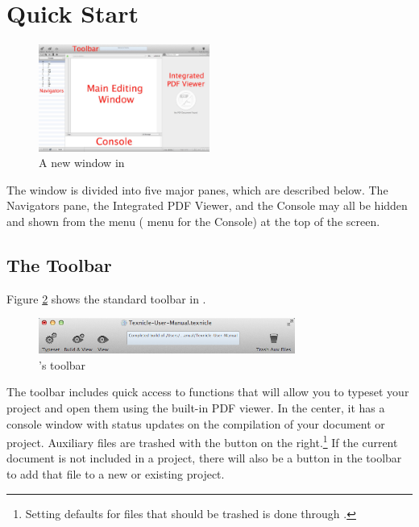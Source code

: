 \section{Quick Start}
\label{userguide.quickstart}
\begin{figure}[htbp]
\centering
\includegraphics[width=0.5\textwidth]{TeXnicle-Images/texnicle-window.jpg}
\caption{A new window in \texnicle}
\label{fig:texnicle-newproject}
\end{figure}

The \texnicle window is divided into five major panes, which are described below. The Navigators pane, the Integrated PDF Viewer, and the Console may all be hidden and shown from the  menu ( menu for the Console) at the top of the screen.

\subsection{The Toolbar}
\label{userguide.quickstart.toolbar}
Figure \ref{fig:texnicle-toolbar} shows the standard toolbar in \texnicle.
\begin{figure}[htbp]
\centering
\includegraphics[width=0.75\textwidth]{TeXnicle-Images/texnicle-toolbar.png}
\caption{\texnicle's toolbar}
\label{fig:texnicle-toolbar}
\end{figure}

The toolbar includes quick access to functions that will allow you to typeset your project and open them using the built-in PDF viewer. In the center, it has a console window with status updates on the compilation of your document or project. Auxiliary files are trashed with the button on the right.\footnote{Setting defaults for files that should be trashed is done through .} If the current document is not included in a project, there will also be a button in the toolbar to add that file to a new or existing project.

